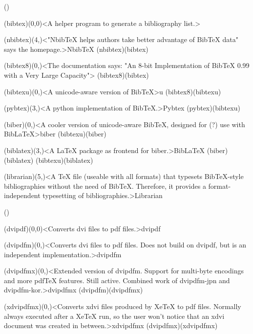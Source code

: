 \documentclass[
%
]{scrartcl}
\begin{document}
\tograph(){
	\tonode(bibtex)(0,0)<A helper program to generate a bibliography list.>{\BibTeX}
	\steplayer[-1]

	\tonode(nbibtex)(4,\layer)<"NbibTeX helps authors take better advantage of BibTeX data" says the homepage.>{NbibTeX}
	\todraw(nbibtex)(bibtex)
	\steplayer[-0.5]

	\tonode(bibtex8)(0,\layer)<The documentation says: "An 8-bit Implementation of BibTeX 0.99 with a Very Large Capacity">{}
	\todraw(bibtex8)(bibtex)
	\steplayer
	
	\tonode(bibtexu)(0,\layer)<A unicode-aware version of BibTeX>{\BibTeX u}
	\todraw(bibtex8)(bibtexu)

	\tonode(pybtex)(3,\layer)<A python implementation of BibTeX.>{Pybtex}
	\todraw(pybtex)(bibtexu)
	\steplayer
	
	\tonode(biber)(0,\layer)<A cooler version of unicode-aware BibTeX, designed for (?) use with BibLaTeX>{biber}
	\todraw(bibtexu)(biber)
	
	\tonode[\package](biblatex)(3,\layer)<A LaTeX package as frontend for biber.>{Bib\LaTeX}
	\todraw(biber)(biblatex)
	\todraw(bibtexu)(biblatex)
	\steplayer

	\tonode[\package](librarian)(5,\layer)<A TeX file (useable with all formats) that typesets BibTeX-style bibliographies without the need of BibTeX. Therefore, it provides a format-independent typesetting of bibliographies.>{Librarian}
}

\tograph(){
	\tonode(dvipdf)(0,0)<Converts dvi files to pdf files.>{dvipdf}
	\steplayer

	\tonode(dvipdfm)(0,\layer)<Converts dvi files to pdf files. Does not build on dvipdf, but is an independent implementation.>{dvipdfm}
	\steplayer

	\tonode(dvipdfmx)(0,\layer)<Extended version of dvipdfm. Support for multi-byte encodings and more pdfTeX features. Still active. Combined work of dvipdfm-jpn and dvipdfm-kor.>{dvipdfmx}
	\todraw(dvipdfm)(dvipdfmx)
	\steplayer

	\tonode(xdvipdfmx)(0,\layer)<Converts xdvi files produced by XeTeX to pdf files. Normally always executed after a XeTeX run, so the user won't notice that an xdvi document was created in between.>{xdvipdfmx}
	\todraw(dvipdfmx)(xdvipdfmx)
}
\end{document}
